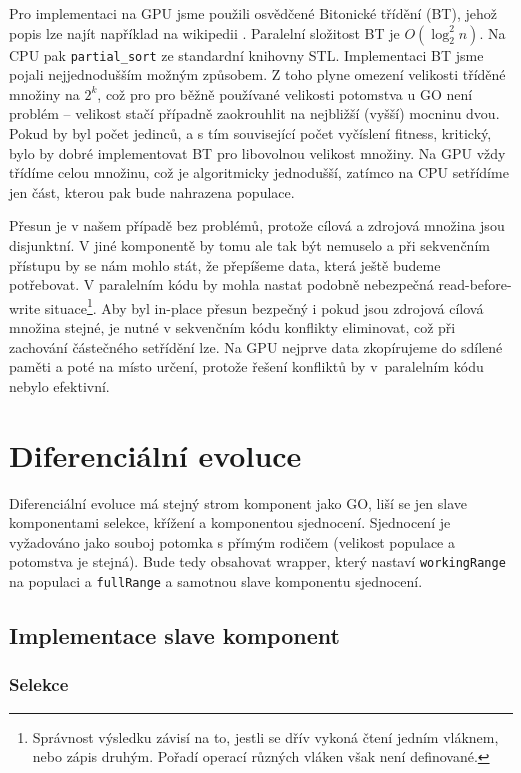 Pro implementaci na GPU jsme použili osvědčené Bitonické třídění (BT), jehož popis lze najít například na wikipedii \cite{Bitonic}. Paralelní složitost BT je $O(\log_2^2 n)$. Na CPU pak \texttt{partial\_sort} ze standardní knihovny STL. Implementaci BT jsme pojali nejjednodušším možným způsobem. Z toho plyne omezení velikosti tříděné množiny na $2^k$, což pro pro běžně používané velikosti potomstva u GO není problém -- velikost stačí případně zaokrouhlit na nejbližší (vyšší) mocninu dvou. Pokud by byl počet jedinců, a s tím související počet vyčíslení fitness, kritický, bylo by dobré implementovat BT pro libovolnou velikost množiny. Na GPU vždy třídíme celou množinu, což je algoritmicky jednodušší, zatímco na CPU setřídíme jen část, kterou pak bude nahrazena populace.\vspace{0.2cm}

Přesun je v našem případě bez problémů, protože cílová a zdrojová množina jsou disjunktní. V jiné komponentě by tomu ale tak být nemuselo a při sekvenčním přístupu by se nám mohlo stát, že přepíšeme data, která ještě budeme potřebovat. V paralelním kódu by mohla nastat podobně nebezpečná read-before-write situace\footnote{Správnost výsledku závisí na to, jestli se dřív vykoná čtení jedním vláknem, nebo zápis druhým. Pořadí operací různých vláken však není definované.}. Aby byl in-place přesun bezpečný i pokud jsou zdrojová cílová množina stejné, je nutné v sekvenčním kódu konflikty eliminovat, což při zachování částečného setřídění lze. Na GPU nejprve data zkopírujeme do sdílené paměti a poté na místo určení, protože řešení konfliktů by v~paralelním kódu nebylo efektivní.

\section{Diferenciální evoluce}

Diferenciální evoluce má stejný strom komponent jako GO, liší se jen slave komponentami selekce, křížení a komponentou sjednocení. Sjednocení je vyžadováno jako souboj potomka s přímým rodičem (velikost populace a potomstva je stejná). Bude tedy obsahovat wrapper, který nastaví \texttt{workingRange} na populaci a \texttt{fullRange} a samotnou slave komponentu sjednocení.

\subsection{Implementace slave komponent}

\subsubsection{Selekce}

